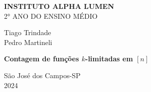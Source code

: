 \begin{center}
  \textbf{INSTITUTO ALPHA LUMEN}\\
  \vspace{0.1cm}
  2° ANO DO ENSINO MÉDIO
\end{center}
\vspace{3cm}
\begin{center}
  Tiago Trindade\\
  Pedro Martineli
\end{center}
\vspace{8cm}
\begin{center}
  \large \textbf{Contagem de funções $k$-limitadas em $[n]$}
\end{center}
\vspace{8cm}
\begin{center}
  São José dos Campos-SP\\2024
\end{center}
\newpage
